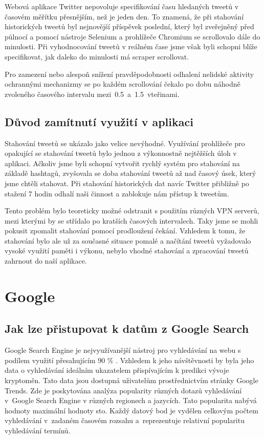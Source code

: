 Webová aplikace Twitter nepovoluje specifikování času hledaných tweetů v časovém měřítku přesnějším, než je jeden den. 
To znamená, že při stahování historických tweetů byl nejnovější příspěvek poslední, který byl zveřejněný před půlnocí a pomocí nástroje Selenium a prohlížeče Chromium se scrollovalo dále do minulosti. 
Při vyhodnocování tweetů v reálném čase jsme však byli schopni blíže specifikovat, jak daleko do minulosti má scraper scrollovat. 

Pro zamezení nebo alespoň snížení pravděpodobnosti odhalení nelidské aktivity ochrannými mechanizmy se po každém scrollování čekalo po dobu náhodně zvoleného časového intervalu mezi~0.5~a~1.5~vteřinami.

\subsection{Důvod zamítnutí využití v aplikaci}

Stahování tweetů se ukázalo jako velice nevýhodné. 
Využívání prohlížeče pro opakující se stahování tweetů bylo jednou z výkonnostně nejtěžších úloh v aplikaci. 
Ačkoliv jsme byli schopní vytvořit rychlý systém pro stahování na základě hashtagů, zvyšovala se doba stahování tweetů až nad časový úsek, který jsme chtěli stahovat. 
Při stahování historických dat navíc Twitter přibližně po stažení 7 hodin odhalí naši činnost a zablokuje nám přístup k tweetům. 

Tento problém bylo teoreticky možné odstranit s použitím různých VPN serverů, mezi kterými by se střídalo po kratších časových intervalech. 
Taky jsme se mohli pokusit zpomalit stahování pomocí prodloužení čekání. 
Vzhledem k tomu, že stahování bylo ale už za současné situace pomalé a načítání tweetů vyžadovalo vysoké využití paměti i výkonu, nebylo vhodné stahování a zpracování tweetů zahrnout do naší aplikace.

\section{Google}

\subsection{Jak lze přistupovat k datům z Google Search}

Google Search Engine je nejvyužívanější nástroj pro vyhledávání na webu s podílem využití přesahujícím 90 \% \cite{search-engines}.
Vzhledem k jeho návštěvnosti by byla jeho data o vyhledávání ideálním ukazatelem přispívajícím k predikci vývoje kryptoměn. 
Tato data jsou dostupná uživatelům prostřednictvím stránky Google Trends. 
Zde je poskytována analýza popularity různých dotazů vyhledávání v~Google Search Engine v různých regionech a jazycích. 
Tato popularita nabývá hodnoty maximální hodnoty sto. 
Každý datový bod je vydělen celkovým počtem vyhledávání v~zadaném časovém rozsahu a~reprezentuje relativní popularitu vyhledávání termínů.

